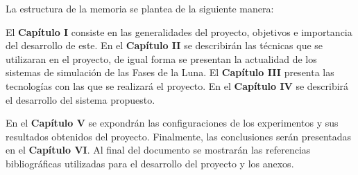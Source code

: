 La estructura de la memoria se plantea de la siguiente manera:

El \textbf{Capítulo I} consiste en las generalidades del proyecto, objetivos e importancia del desarrollo de este. En el \textbf{Capítulo II} se describirán las técnicas que se utilizaran en el proyecto, de igual forma se presentan la actualidad de los sistemas de simulación de las Fases de la Luna. El \textbf{Capítulo III} presenta las tecnologías con las que se realizará el proyecto. En el \textbf{Capítulo IV} se describirá el desarrollo del sistema propuesto.

En el \textbf{Capítulo V} se expondrán las configuraciones de los experimentos y sus resultados obtenidos del proyecto. Finalmente, las conclusiones serán presentadas en el \textbf{Capítulo VI}. Al final del documento se mostrarán las referencias bibliográficas utilizadas para el desarrollo del proyecto y los anexos.
